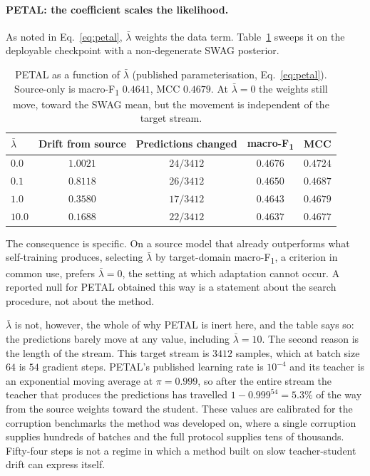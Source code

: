 \documentclass[a4paper,fleqn]{cas-dc}
\newcommand{\macf}{macro-F\textsubscript{1}}
\begin{document}
\paragraph{PETAL: the coefficient scales the likelihood.} As noted in
Eq.~\ref{eq:petal}, $\bar\lambda$ weights the data term. Table~\ref{tab:lambda} sweeps it
on the deployable checkpoint with a non-degenerate SWAG posterior.

\begin{table}[t]
\centering
\caption{PETAL as a function of $\bar\lambda$ (published parameterisation,
Eq.~\ref{eq:petal}). Source-only is \macf{} $0.4641$, MCC $0.4679$. At $\bar\lambda=0$
the weights still move, toward the SWAG mean, but the movement is independent of
the target stream.}
\label{tab:lambda}
\small
\begin{tabular}{lcccc}
\toprule
$\bar\lambda$ & Drift from source & Predictions changed & \macf & MCC \\
\midrule
$0.0$  & $1.0021$ & $24/3412$ & $0.4676$ & $0.4724$ \\
$0.1$  & $0.8118$ & $26/3412$ & $0.4650$ & $0.4687$ \\
$1.0$  & $0.3580$ & $17/3412$ & $0.4643$ & $0.4679$ \\
$10.0$ & $0.1688$ & $22/3412$ & $0.4637$ & $0.4677$ \\
\bottomrule
\end{tabular}
\end{table}

The consequence is specific. On a source model that already outperforms what self-training
produces, selecting $\bar\lambda$ by target-domain \macf{}, a criterion in common use,
prefers $\bar\lambda=0$, the setting at which adaptation cannot occur. A reported null for
PETAL obtained this way is a statement about the search procedure, not about the method.

$\bar\lambda$ is not, however, the whole of why PETAL is inert here, and the table says so:
the predictions barely move at any value, including $\bar\lambda=10$. The second reason is
the length of the stream. This target stream is $3412$ samples, which at batch size $64$
is $54$ gradient steps. PETAL's published learning rate is $10^{-4}$ and its teacher is an
exponential moving average at $\pi=0.999$, so after the entire stream the teacher that
produces the predictions has travelled $1-0.999^{54}=5.3\%$ of the way from the source
weights toward the student. These values are calibrated for the corruption benchmarks the
method was developed on, where a single corruption supplies hundreds of batches and the
full protocol supplies tens of thousands. Fifty-four steps is not a regime in which a
method built on slow teacher-student drift can express itself.
\end{document}

